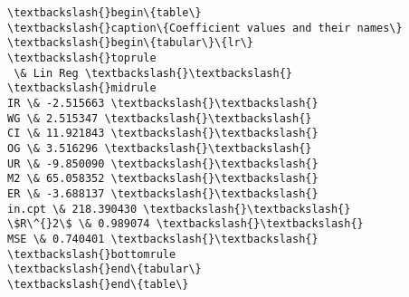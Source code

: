 \documentclass[11pt]{article}
\begin{document}
    \begin{Verbatim}[commandchars=\\\{\}]
\textbackslash{}begin\{table\}
\textbackslash{}caption\{Coefficient values and their names\}
\textbackslash{}begin\{tabular\}\{lr\}
\textbackslash{}toprule
 \& Lin Reg \textbackslash{}\textbackslash{}
\textbackslash{}midrule
IR \& -2.515663 \textbackslash{}\textbackslash{}
WG \& 2.515347 \textbackslash{}\textbackslash{}
CI \& 11.921843 \textbackslash{}\textbackslash{}
OG \& 3.516296 \textbackslash{}\textbackslash{}
UR \& -9.850090 \textbackslash{}\textbackslash{}
M2 \& 65.058352 \textbackslash{}\textbackslash{}
ER \& -3.688137 \textbackslash{}\textbackslash{}
in.cpt \& 218.390430 \textbackslash{}\textbackslash{}
\$R\^{}2\$ \& 0.989074 \textbackslash{}\textbackslash{}
MSE \& 0.740401 \textbackslash{}\textbackslash{}
\textbackslash{}bottomrule
\textbackslash{}end\{tabular\}
\textbackslash{}end\{table\}

    \end{Verbatim}
\end{document}
